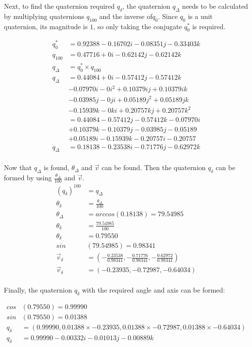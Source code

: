 \documentclass{article}
\begin{document}
Next, to find the quaternion required $q_{\delta}$, the quaternion $q_{\Delta}$ needs to be calculated by multiplying quaternions $q_{100}$ and the inverse of$q_{0}$. Since $q_{0}$ is a unit quaternion, its magnitude is $1$, so only taking the conjugate $q^*_0$ is required.

\begin{align*}
q_0^* &= 0.92388 - 0.16702i - 0.08351j - 0.33403k\\[1em]
q_{100} &= 0.47716 + 0i - 0.62142j - 0.62142k\\[1em]
q_{\Delta} &= q_0^* \times q_{100}\\[1em]
q_{\Delta} &= 0.44084 + 0i - 0.57412j - 0.57412k\\
 &- 0.07970i - 0i^2 + 0.10379ij + 0.10379ik\\
 &- 0.03985j - 0ji + 0.05189j^2 + 0.05189jk\\
 &- 0.15939k - 0ki + 0.20757kj + 0.20757k^2\\[1em]
 &= 0.44084 - 0.57412j - 0.57412k - 0.07970i\\
 &+ 0.10379k - 0.10379j - 0.03985j - 0.05189\\
 &+ 0.05189i - 0.15939k - 0.20757i - 0.20757\\[1em]
q_{\Delta} &=0.18138 - 0.23538i - 0.71776j - 0.62972k\\[1em]
\end{align*}

Now that $q_{\Delta}$ is found, $\theta_{\Delta}$ and $\vec{v}$ can be found. Then the quaternion $q_{\delta}$ can be formed by using $\frac{\theta_{\Delta}}{100}$ and $\vec{v}$.
\begin{align*}
(q_{\delta})^{100} &= q_{\Delta}\\[1em]
\theta_{\delta} &= \frac{\theta_{\Delta}}{100}\\[1em]
\theta_{\Delta} &= arccos(0.18138) = 79.54985\\[1em]
\theta_{\delta} &= \frac{79.54985}{100}\\[1em]
\theta_{\delta} &= 0.79550\\[1em]
sin&(79.54985) = 0.98341\\[1em]
\vec{v}_{\delta} &=  (- \frac{0.23538}{0.98341}, - \frac{0.71776}{0.98341}, - \frac{0.62972}{0.98341})\\
\vec{v}_{\delta} &= (-0.23935, -0.72987, -0.64034)\\[1em]
\end{align*}

Finally, the quaternion $q_{\delta}$ with the required angle and axis can be formed:

\begin{align*}
cos&(0.79550) = 0.99990\\[1em]
sin&(0.79550) = 0.01388\\[1em]
q_{\delta} &= (0.99990, 0.01388 \times - 0.23935, 0.01388 \times - 0.72987, 0.01388 \times - 0.64034)\\[1em]
q_{\delta} &= 0.99990 - 0.00332i - 0.01013j - 0.00889k\\
\end{align*}
\end{document}
